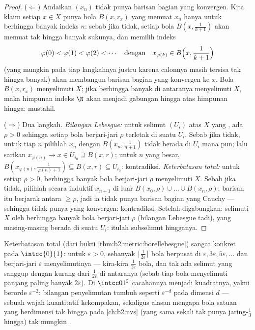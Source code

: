 \begin{proof}
($\Leftarrow$) Andaikan $(x_n)$ tidak punya barisan bagian yang
konvergen. Kita klaim setiap $x \in X$ punya bola $B(x, r_x)$ yang memuat
$x_n$ hanya untuk berhingga banyak indeks $n$: sebab jika tidak, setiap
bola $B(x, \frac1{k+1})$ akan memuat tak hingga banyak sukunya, dan
memilih indeks
\[
\varphi(0) < \varphi(1) < \varphi(2) < \cdots
\quad\text{dengan}\quad
x_{\varphi(k)} \in B\Bigl(x, \frac{1}{k+1}\Bigr)
\]
(yang mungkin pada tiap langkahnya justru karena calonnya masih tersisa
tak hingga banyak) akan membangun barisan bagian yang konvergen ke $x$.
Bola $B(x, r_x)$ menyelimuti $X$; jika berhingga banyak di antaranya
menyelimuti $X$, maka himpunan indeks $\N$ akan menjadi gabungan hingga
atas himpunan hingga: mustahil.

($\Rightarrow$) Dua langkah. \emph{Bilangan Lebesgue:} untuk selimut
 $(U_i)$ atas $X$ yang , ada $\rho > 0$ sehingga setiap bola
berjari-jari $\rho$ terletak di suatu $U_i$. Sebab jika tidak, untuk tiap
$n$ pilihlah $x_n$ dengan $B(x_n, \frac{1}{n+1})$ tidak berada di $U_i$
mana pun; lalu sarikan $x_{\varphi(n)} \to x \in U_{i_0} \supseteq B(x,
r)$; untuk $n$ yang besar, $B(x_{\varphi(n)}, \frac{1}{\varphi(n)+1})
\subseteq B(x, r) \subseteq U_{i_0}$: kontradiksi. \emph{Keterbatasan
total:} untuk setiap $\rho > 0$, berhingga banyak bola berjari-jari
$\rho$ menyelimuti $X$. Sebab jika tidak, pilihlah secara induktif
$x_{n+1}$ di luar $B(x_0, \rho) \cup \dots \cup B(x_n, \rho)$: barisan
itu berjarak antara $\geq \rho$, jadi ia tidak punya barisan bagian yang
Cauchy --- sehingga tidak punya yang konvergen: kontradiksi. Setelah
digabungkan: selimuti $X$ oleh berhingga banyak bola berjari-jari $\rho$
(bilangan Lebesgue tadi), yang masing-masing berada di suatu $U_i$:
itulah subselimut hingganya.
\end{proof}

\begin{example}\label{ex:b2:metric:epsnet}
Keterbatasan total (dari bukti
\cref{thm:b2:metric:borellebesgue}) sangat konkret pada
$\intcc{0}{1}$: untuk $\varepsilon > 0$, sebanyak $\lceil
\frac{1}{2\varepsilon}\rceil$ bola berpusat di $\varepsilon,
3\varepsilon, 5\varepsilon, \dots$ dan berjari-jari $\varepsilon$
menyelimutinya --- kira-kira $\frac1{2\varepsilon}$ bola, dan tak ada
selimut yang sanggup dengan kurang dari $\frac{1}{2\varepsilon}$ di
antaranya (sebab tiap bola menyelimuti panjang paling banyak
$2\varepsilon$). Di $\intcc01^2$ cacahannya menjadi kuadratnya, yakni
berorde $\varepsilon^{-2}$: bilangan penyelimutan tumbuh seperti
$\varepsilon^{-d}$ pada dimensi $d$ --- sebuah wajah kuantitatif
kekompakan, sekaligus alasan mengapa bola satuan yang berdimensi tak hingga
pada \cref{ch:b2:nvs} (yang sama sekali tak punya jaring-$\frac13$
hingga) tak mungkin .
\end{example}

